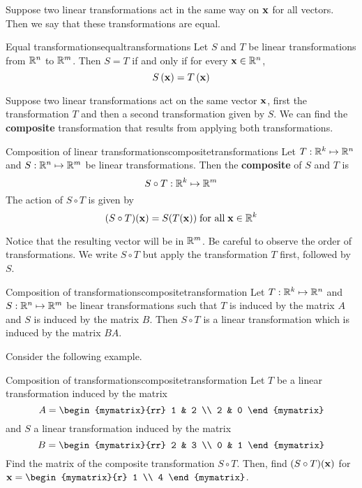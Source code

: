 Suppose two linear transformations act in the same way on ${\bf x}$ for all vectors. Then we say that these transformations are equal.

\begin{definition}{Equal transformations}{equaltransformations}
Let $S$ and $T$ be linear transformations from $\mathbb{R}^n$ to $\mathbb{R}^m$. Then $S = T$ if and only if for every ${\bf x} \in \mathbb{R}^n$, 
\[
S \left({\bf x} \right) = T \left({\bf x} \right)
\]
\end{definition}

Suppose two linear transformations act on the same vector ${\bf x}$, first the transformation $T$ and then a second transformation given by $S$. We can find the \textbf{composite} transformation that results from applying both transformations.

\begin{definition}{Composition of linear transformations}{compositetransformations}
Let $T: \mathbb{R}^k \mapsto \mathbb{R}^n$ and $S: \mathbb{R}^n \mapsto \mathbb{R}^m$ be linear transformations. Then the \textbf{composite} of $S$ and $T$ is 
\[
S \circ T: \mathbb{R}^k \mapsto \mathbb{R}^m
\]
The action of $S \circ T$ is given by 
\[
(S \circ T) ({\bf x}) = S(T({\bf x})) \; \mbox{for all} \; {\bf x} \in \mathbb{R}^k
\]
\end{definition}

Notice that the resulting vector will be in $\mathbb{R}^m$. Be careful to observe the order of transformations. We write $S \circ T$ but apply the transformation $T$ first, followed by $S$. 

\begin{theorem}{Composition of transformations}{compositetransformation}
Let $T: \mathbb{R}^k \mapsto \mathbb{R}^n$ and $S: \mathbb{R}^n \mapsto \mathbb{R}^m$ be linear transformations such that $T$ is induced by the matrix $A$ and $S$ is induced by the matrix $B$. Then $S \circ T$ is a linear transformation which is induced by the matrix $BA$.
\end{theorem}

Consider the following example. 

\begin{example}{Composition of transformations}{compositetransformation}
Let $T$ be a linear transformation induced by the matrix 
\[
A = 
\begin{mymatrix}{rr}
1 & 2 \\
2 & 0 
\end{mymatrix}
\]
and $S$ a linear transformation induced by the matrix
\[
B = 
\begin{mymatrix}{rr}
2 & 3 \\
0 & 1
\end{mymatrix}
\]
Find the matrix of the composite transformation $S \circ T$. Then, find $(S \circ T)({\bf x})$ for $\vect{x} = \begin{mymatrix}{r}
1 \\
4 
\end{mymatrix}$.
\end{example}

